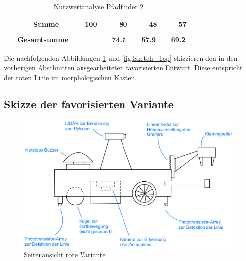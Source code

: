 \documentclass[main.tex]{subfiles} %
\begin{document}
\begin{landscape}
\begin{table}[ht]
\begin{tabular}{|p{0.11\linewidth}|p{0.18\linewidth}|p{0.085\linewidth}|p{0.057\linewidth}|p{0.07\linewidth}|p{0.057\linewidth}|p{0.07\linewidth}|p{0.057\linewidth}|p{0.07\linewidth}|}
                                                           & \textbf{Summe}                      & \textbf{100}                               &                                             & \textbf{80}                                 &   & \textbf{48}   &   & \textbf{57} \\[1pt]
            \hline
            \hline
            \multicolumn{2}{|c|}{}                         &                                     & \multicolumn{2}{c|}{}                      & \multicolumn{2}{c|}{}                       & \multicolumn{2}{c|}{}                                                             \\[-9pt]
            \multicolumn{2}{|c|}{\textbf{Gesamtsumme}}     &                                     & \multicolumn{2}{c|}{\textbf{74.7}}         & \multicolumn{2}{c|}{\textbf{57.9}}          & \multicolumn{2}{c|}{\textbf{69.2}}                                                \\[1pt]
            \hline
        \end{tabular}
        \caption{Nutzwertanalyse Pfadfinder 2}
    \end{table}

    \newpage

    Die nachfolgenden Abbildungen \ref{fig:Sketch_Side} und \ref{fig:Sketch_Top}
    skizzieren den in den vorherigen Abschnitten ausgearbeiteten favorisierten Entwurf. Diese entspricht 
    der roten Linie im morphologischen Kasten. 

    \subsection{Skizze der favorisierten Variante}

    \begin{figure}[h] %
        \centering %
        \includegraphics[width=1\textwidth]{./Skizzen/Sketch_Side.png} %
        \caption{Seitenansicht rote Variante} %
        \label{fig:Sketch_Side} %
    \end{figure}


\end{landscape}
\end{document}
